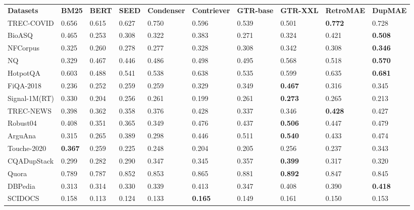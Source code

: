 \documentclass[11pt,a4paper]{article}
\newcommand\ChangeRT[1]{\noalign{\hrule height #1}}
\begin{document}
\begin{table*}[t]
    \centering
\scriptsize
\begin{tabular}{p{1.7cm}|C{0.8cm}|C{0.8cm}|C{0.8cm}|C{1.2cm}|C{1.2cm}|C{1.2cm}|C{1.2cm}|C{1.2cm}|C{1.2cm} }
    \ChangeRT{1pt}
    \textbf{Datasets} & \textbf{BM25} & 
    \textbf{BERT} & \textbf{SEED} & \textbf{Condenser} & \textbf{Contriever} & \textbf{GTR-base} & \textbf{GTR-XXL} & \textbf{RetroMAE} & \textbf{DupMAE} \\
\hhline{=|=|=|=|=|=|=|=|=|=}
    TREC-COVID & 0.656 & 0.615 & 0.627 & 0.750 & 0.596 & 0.539 & 0.501 & \textbf{0.772} & 0.728 \\
    BioASQ & 0.465 & 0.253 & 0.308 & 0.322 & 0.383 & 0.271 & 0.324 & 0.421 & \textbf{0.508} \\
    NFCorpus & 0.325 & 0.260 & 0.278 & 0.277 & 0.328 & 0.308 & 0.342 & 0.308 & \textbf{0.346} \\
    \hline
    NQ & 0.329 & 0.467 & 0.446 & 0.486 & 0.498 & 0.495 & {0.568} & 0.518 & \textbf{0.570}   \\
    HotpotQA & 0.603 & 0.488 & 0.541 & 0.538 & 0.638 & 0.535 & 0.599 & 0.635 & \textbf{0.681}  \\
    FiQA-2018 & 0.236 & 0.252 & 0.259 & 0.259 & 0.329 & 0.349 & \textbf{0.467} & 0.316 & 0.345  \\
    \hline
    Signal-1M(RT) & 0.330 & 0.204 & 0.256 & 0.261 & 0.199 & 0.261 & \textbf{0.273} & 0.265 & 0.213  \\
    \hline
    TREC-NEWS & 0.398 & 0.362 & 0.358 & 0.376 & 0.428 & 0.337 & 0.346 & \textbf{0.428} & {0.427}  \\
    Robust04 & 0.408 & 0.351 & 0.365 & 0.349 & 0.476 & 0.437 & \textbf{0.506} & 0.447 & {0.479} \\
    \hline
    ArguAna & 0.315 & 0.265 & 0.389 & 0.298 & 0.446 & 0.511 & \textbf{0.540} & 0.433 & 0.474  \\
    Touche-2020 & \textbf{0.367} & 0.259 & 0.225 & 0.248 & 0.204 & 0.205 & 0.256 & 0.237 & 0.343  \\
    \hline
    CQADupStack & 0.299 & 0.282 & 0.290 & 0.347 & 0.345 & 0.357 & \textbf{0.399} & 0.317 & 0.320  \\
    Quora & 0.789 & 0.787 & 0.852 & 0.853 & 0.865 & 0.881 & \textbf{0.892} & 0.847 & 0.845  \\
    \hline
    DBPedia & 0.313 & 0.314 & 0.330 & 0.339 & {0.413} & 0.347 & 0.408 & 0.390 & \textbf{0.418} \\
    \hline
    SCIDOCS & 0.158 & 0.113 & 0.124 & 0.133 & \textbf{0.165} & 0.149 & 0.161 & 0.150 & 0.153  \\

\end{tabular}
\end{table*}
\end{document}
